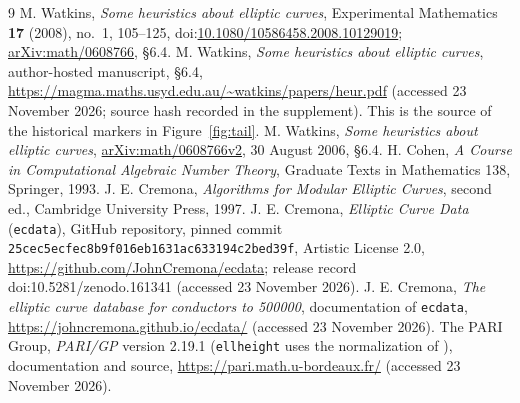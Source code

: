 \documentclass[11pt,a4paper]{article}
\begin{document}
\begin{thebibliography}{9}\small\setlength{\itemsep}{1pt}
 M. Watkins, \emph{Some heuristics about elliptic curves}, Experimental Mathematics \textbf{17} (2008), no.~1, 105--125, doi:\href{https://doi.org/10.1080/10586458.2008.10129019}{10.1080/10586458.2008.10129019}; \href{https://arxiv.org/abs/math/0608766}{arXiv:math/0608766}, \S6.4.
 M. Watkins, \emph{Some heuristics about elliptic curves}, author-hosted manuscript, \S6.4, \url{https://magma.maths.usyd.edu.au/~watkins/papers/heur.pdf} (accessed 23 November 2026; source hash recorded in the supplement). This is the source of the historical markers in Figure~\ref{fig:tail}.
 M. Watkins, \emph{Some heuristics about elliptic curves}, \href{https://arxiv.org/abs/math/0608766v2}{arXiv:math/0608766v2}, 30 August 2006, \S6.4.
 H. Cohen, \emph{A Course in Computational Algebraic Number Theory}, Graduate Texts in Mathematics 138, Springer, 1993.
 J. E. Cremona, \emph{Algorithms for Modular Elliptic Curves}, second ed., Cambridge University Press, 1997.
 J. E. Cremona, \emph{Elliptic Curve Data} (\texttt{ecdata}), GitHub repository, pinned commit \texttt{25cec5ecfec8b9f016eb1631ac633194c2bed39f}, Artistic License 2.0, \url{https://github.com/JohnCremona/ecdata}; release record doi:10.5281/zenodo.161341 (accessed 23 November 2026).
 J. E. Cremona, \emph{The elliptic curve database for conductors to 500000}, documentation of \texttt{ecdata}, \url{https://johncremona.github.io/ecdata/} (accessed 23 November 2026).
 The PARI Group, \emph{PARI/GP} version 2.19.1 (\texttt{ellheight} uses the normalization of \cite{Cremona1997}), documentation and source, \url{https://pari.math.u-bordeaux.fr/} (accessed 23 November 2026).
\end{thebibliography}
\end{document}
